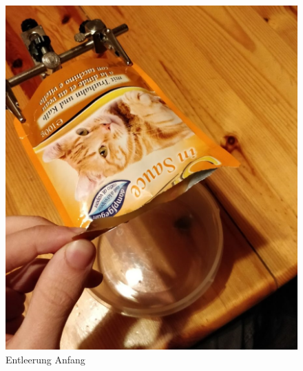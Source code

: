 \begin{figure}[H]
\begin{minipage}[hbt]{.4\linewidth}
      \includegraphics[width=\linewidth]{Bilder/Fuetterungsexperiment/Fuetterungs_Anfang}
      \caption{Entleerung Anfang}
	  \label{Fütterungs Anfang}      
      \end{minipage}
\end{figure}


